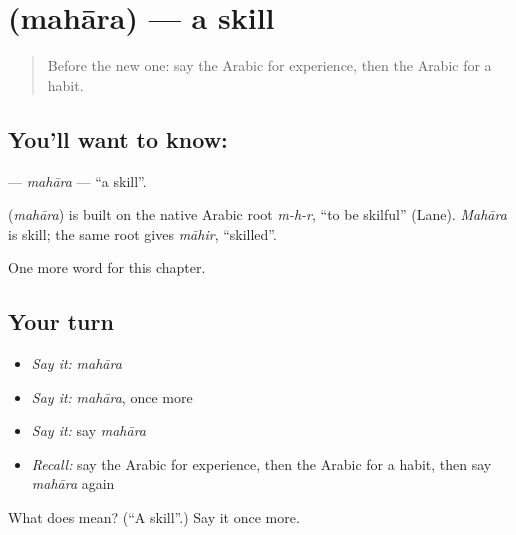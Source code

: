 \section[\texorpdfstring{\ar{مهارة} (mahāra)}{مهارة (mahāra)}]{ (mahāra) — a skill}

\label{lesson:AR-C109-mahara}



\begin{quote}
Before the new one: say the Arabic for experience, then the Arabic for a habit.
\end{quote}

\subsection*{You'll want to know: }
\textbf{} — \emph{mahāra} — \textquotedblleft{}a skill\textquotedblright{}.

\begin{cousinweb}
\textbf{} (\emph{mahāra}) is built on the native Arabic root \emph{m-h-r}, \textquotedblleft{}to be skilful\textquotedblright{} (Lane). \emph{Mahāra} is skill; the same root gives \emph{māhir}, \textquotedblleft{}skilled\textquotedblright{}.
\end{cousinweb}

\begin{grammarlens}[title={What you've built}]
One more word for this chapter.
\end{grammarlens}

\subsection*{Your turn}
\begin{itemize}
\raggedright
  \item \emph{Say it:} \emph{mahāra}
  \item \emph{Say it:} \emph{mahāra}, once more
  \item \emph{Say it:} say \emph{mahāra}
  \item \emph{Recall:} say the Arabic for experience, then the Arabic for a habit, then say \emph{mahāra} again
\end{itemize}

\begin{tcolorbox}[breakable,colback=teal!4,colframe=teal!35!black,title={Before you move on}]
What does  mean? (\textquotedblleft{}A skill\textquotedblright{}.) Say it once more.
\end{tcolorbox}
